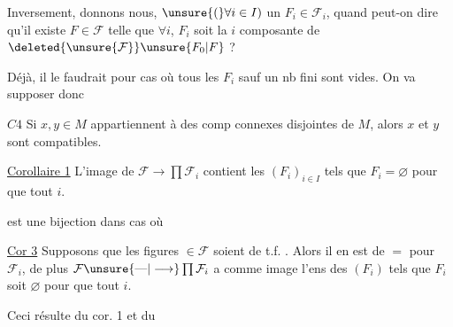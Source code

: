 
Inversement, donnons nous,  $\unsure{(}\forall i\in I)$ un $F_i\in\mathcal F_i$, quand peut-on dire qu'il existe $F\in\mathcal F$ telle que $\forall i$, $F_i$ soit la $i$ composante de $\deleted{\unsure{\mathcal F}}\unsure{F_0|F}$ ?

Déjà, il le faudrait pour  cas où tous les $F_i$ sauf un nb fini sont \deleted{$\varnothing$} vides. On va supposer donc

\uline{$C4$} Si $x,y\in M$ appartiennent à des comp connexes disjointes de $M$, alors $x$ et $y$ sont compatibles.

 

\uline{Corollaire 1} L'image de $\mathcal F\to\prod\mathcal F_i$ contient les $(F_i)_{i\in I}$ tels que $F_i=\varnothing$  pour  que tout $i$.

est une bijection dans   cas où  



\uline{Cor 3} Supposons que les figures  $\in\mathcal F$ soient de t.f.  . Alors il en est de $=$  pour $\mathcal F_i$, de plus $\mathcal F\unsure{\text{---}|\longrightarrow}\prod\mathcal F_i$ a comme image l'ens des $(F_i)$ tels que $F_i$ soit $\varnothing$ pour  que tout $i$.

Ceci résulte du  cor. 1 et du

